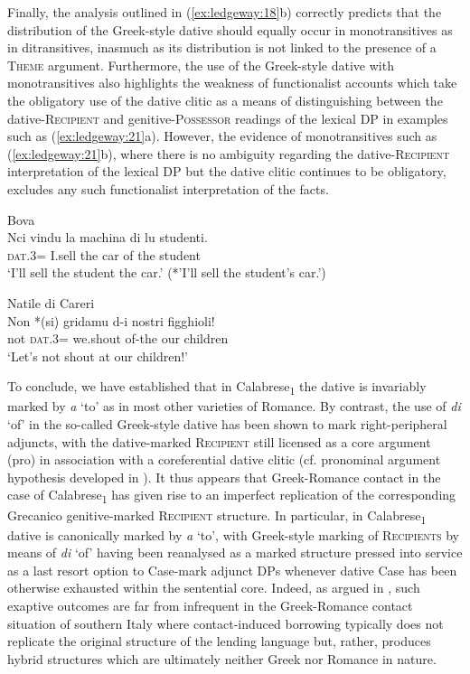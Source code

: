 \documentclass[output=paper,modfonts,nonflat,colorlinks,citecolor=brown]{langsci/langscibook}
\begin{document}
  Finally, the analysis outlined in (\ref{ex:ledgeway:18}b) correctly predicts that the distribution of the Greek-style dative should equally occur in monotransitives as in ditransitives, inasmuch as its distribution is not linked to the presence of a \textsc{Theme} argument. Furthermore, the use of the Greek-style dative with monotransitives also highlights the weakness of functionalist accounts which take the obligatory use of the dative clitic as a means of distinguishing between the dative-\textsc{Recipient} and genitive-\textsc{Possessor} readings of the lexical DP in examples such as (\ref{ex:ledgeway:21}a). However, the evidence of monotransitives such as (\ref{ex:ledgeway:21}b), where there is no ambiguity regarding the dative-\textsc{Recipient} interpretation of the lexical DP but the dative clitic continues to be obligatory, excludes any such functionalist interpretation of the facts.

\ea\label{ex:ledgeway:21}
\ea  Bova\\
\gll Nci  vindu  la  machina  di  lu  studenti.\\
    \textsc{dat}.3=  I.sell  the  car  of  the  student\\
    \glt `I’ll sell the student the car.' (*'I’ll sell the student’s car.')

\ex Natile di Careri\\
    \gll Non  *(si)  gridamu  d-i  nostri  figghioli!\\
    not  \textsc{dat}.3=  we.shout  of-the  our  children\\
    \glt `Let’s not shout at our children!'
    \z
    \z

  To conclude, we have established that in Calabrese\textsubscript{1} the dative is invariably marked by \textit{a} ‘to’ as in most other varieties of Romance. By contrast, the use of \textit{di} ‘of’ in the so-called Greek-style dative has been shown to mark right-peripheral adjuncts, with the dative-marked \textsc{Recipient} still licensed as a core argument (pro) in association with a coreferential dative clitic (cf. pronominal argument hypothesis developed in \citealt{Jelinek1984}). It thus appears that Greek-Romance contact in the case of Calabrese\textsubscript{1} has given rise to an imperfect replication of the corresponding Grecanico genitive-marked \textsc{Recipient} structure. In particular, in Calabrese\textsubscript{1} dative is canonically marked by \textit{a} ‘to’, with Greek-style marking of \textsc{Recipients} by means of \textit{di} ‘of’ having been reanalysed as a marked structure pressed into service as a last resort option to Case-mark adjunct DPs whenever dative Case has been otherwise exhausted within the sentential core. Indeed, as argued in \citet{Ledgeway2013}, such exaptive outcomes are far from infrequent in the Greek-Romance contact situation of southern Italy where contact-induced borrowing typically does not replicate the original structure of the lending language but, rather, produces hybrid structures which are ultimately neither Greek nor Romance in nature.
\end{document}
